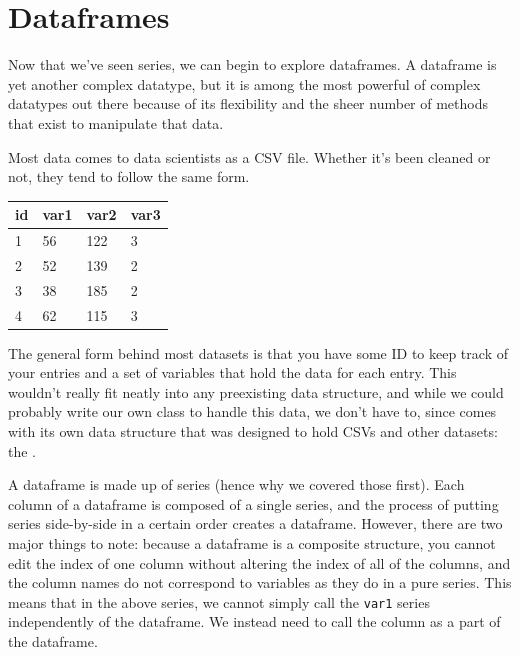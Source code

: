 \section{Dataframes}
Now that we've seen series, we can begin to explore dataframes. A dataframe is yet another complex datatype, but it is among the most powerful of complex datatypes out there because of its flexibility and the sheer number of methods that exist to manipulate that data.\par
Most data comes to data scientists as a CSV file. Whether it's been cleaned or not, they tend to follow the same form.\par
\vspace{5mm}
\begin{tabular}{|l|l|l|l|}
\hline
id & var1 & var2 & var3 \\
\hline
1  & 56   & 122  & 3    \\
\hline
2  & 52   & 139  & 2    \\
\hline
3  & 38   & 185  & 2    \\
\hline
4  & 62   & 115  & 3    \\
\hline
\end{tabular}\par
\vspace{5mm}
The general form behind most datasets is that you have some ID to keep track of your entries and a set of variables that hold the data for each entry. This wouldn't really fit neatly into any preexisting data structure, and while we could probably write our own class to handle this data, we don't have to, since  comes with its own data structure that was designed to hold CSVs and other datasets: the  .\par
A dataframe is made up of  series (hence why we covered those first). Each column of a dataframe is composed of a single  series, and the process of putting series side-by-side in a certain order creates a dataframe. However, there are two major things to note: because a dataframe is a composite structure, you cannot edit the index of one column without altering the index of all of the columns, and the column names do not correspond to variables as they do in a pure series. This means that in the above series, we cannot simply call the \verb|var1| series independently of the dataframe. We instead need to call the column as a part of the dataframe.\par
